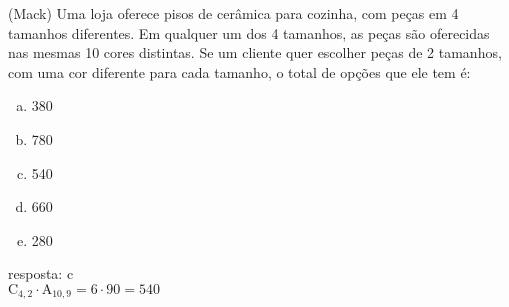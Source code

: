 \begin{ex}
(Mack) Uma loja oferece pisos de cerâmica para cozinha, com peças em 4 tamanhos diferentes. Em qualquer um dos 4 tamanhos, as peças são oferecidas nas mesmas 10 cores distintas. Se um cliente quer escolher peças de 2 tamanhos, com uma cor diferente para cada tamanho, o total de opções
que ele tem é:
   \begin{enumerate}[(a)]
   \item 380
   \item 780
   \item 540
   \item 660
   \item 280
   \end{enumerate}
     \begin{sol}
      resposta: c \\
      $\mathrm{C}_{4,2}\cdot\mathrm{A}_{{10},9}=6\cdot90=540$
     \end{sol}
\end{ex}